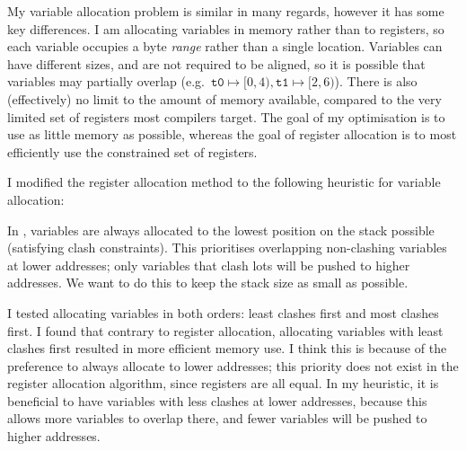 \documentclass[00-main.tex]{subfiles}
\begin{document}
My variable allocation problem is similar in many regards, however it has some key differences.
I am allocating variables in memory rather than to registers, so each variable occupies a byte \emph{range} rather than a single location.
Variables can have different sizes, and are not required to be aligned, so it is possible that variables may partially overlap (e.g.\ $\texttt{t0} \mapsto [0, 4), \texttt{t1} \mapsto [2, 6)$). %
There is also (effectively) no limit to the amount of memory available, compared to the very limited set of registers most compilers target.
The goal of my optimisation is to use as little memory as possible, whereas the goal of register allocation is to most efficiently use the constrained set of registers.

I modified the register allocation method to the following heuristic for variable allocation:


In , variables are always allocated to the lowest position on the stack possible (satisfying clash constraints).
This prioritises overlapping non-clashing variables at lower addresses; only variables that clash lots will be pushed to higher addresses.
We want to do this to keep the stack size as small as possible.

I tested allocating variables in both orders: least clashes first and most clashes first.
I found that contrary to register allocation, allocating variables with least clashes first resulted in more efficient memory use.
I think this is because of the preference to always allocate to lower addresses; this priority does not exist in the register allocation algorithm, since registers are all equal.
In my heuristic, it is beneficial to have variables with less clashes at lower addresses, because this allows more variables to overlap there, and fewer variables will be pushed to higher addresses.
\end{document}
